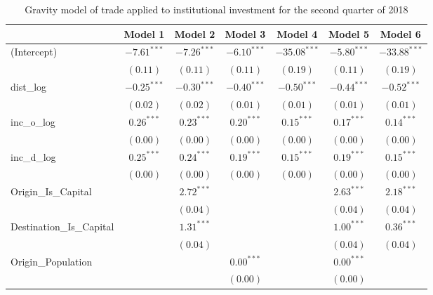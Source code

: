 \begin{table}
	\begin{center}
		\small
		\caption[CGravity Model of Trade for Q2 2018]{Gravity model of trade applied to institutional investment for the second quarter of 2018}
		\begin{tabular}{l c c c c c c }
			\hline
			& Model 1 & Model 2 & Model 3 & Model 4 & Model 5 & Model 6 \\
			\hline
			(Intercept)                  & $-7.61^{***}$ & $-7.26^{***}$ & $-6.10^{***}$ & $-35.08^{***}$ & $-5.80^{***}$ & $-33.88^{***}$ \\
			& $(0.11)$      & $(0.11)$      & $(0.11)$      & $(0.19)$       & $(0.11)$      & $(0.19)$       \\
			dist\_log                    & $-0.25^{***}$ & $-0.30^{***}$ & $-0.40^{***}$ & $-0.50^{***}$  & $-0.44^{***}$ & $-0.52^{***}$  \\
			& $(0.02)$      & $(0.02)$      & $(0.01)$      & $(0.01)$       & $(0.01)$      & $(0.01)$       \\
			inc\_o\_log                  & $0.26^{***}$  & $0.23^{***}$  & $0.20^{***}$  & $0.15^{***}$   & $0.17^{***}$  & $0.14^{***}$   \\
			& $(0.00)$      & $(0.00)$      & $(0.00)$      & $(0.00)$       & $(0.00)$      & $(0.00)$       \\
			inc\_d\_log                  & $0.25^{***}$  & $0.24^{***}$  & $0.19^{***}$  & $0.15^{***}$   & $0.19^{***}$  & $0.15^{***}$   \\
			& $(0.00)$      & $(0.00)$      & $(0.00)$      & $(0.00)$       & $(0.00)$      & $(0.00)$       \\
			Origin\_Is\_Capital          &               & $2.72^{***}$  &               &                & $2.63^{***}$  & $2.18^{***}$   \\
			&               & $(0.04)$      &               &                & $(0.04)$      & $(0.04)$       \\
			Destination\_Is\_Capital     &               & $1.31^{***}$  &               &                & $1.00^{***}$  & $0.36^{***}$   \\
			&               & $(0.04)$      &               &                & $(0.04)$      & $(0.04)$       \\
			Origin\_Population           &               &               & $0.00^{***}$  &                & $0.00^{***}$  &                \\
			&               &               & $(0.00)$      &                & $(0.00)$      &                \\

\end{tabular}
\end{center}
\end{table}
